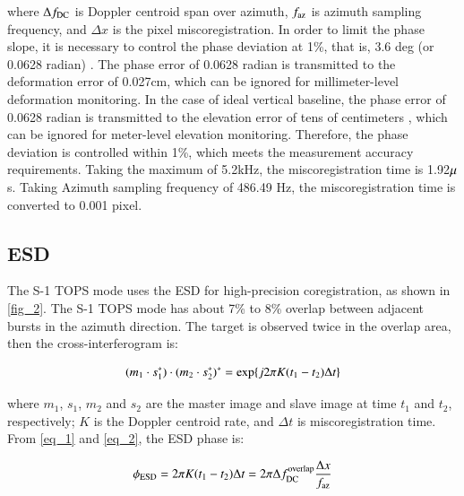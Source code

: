 \documentclass[preprint, authoryear]{elsarticle}
\begin{document}
\noindent where $\Delta f_{\rm DC}$ is Doppler centroid span over azimuth, $f_{\rm az}$ is azimuth sampling frequency, and $\Delta x$ is the pixel miscoregistration. In order to limit the phase slope, it is necessary to control the phase deviation at 1\%, that is, 3.6 deg (or 0.0628 radian) \cite{Interferometric_Processing_of_Sentinel-1_TOPS_Data}. The phase error of 0.0628 radian is transmitted to the deformation error of 0.027cm, which can be ignored for millimeter-level deformation monitoring. In the case of ideal vertical baseline, the phase error of 0.0628 radian is transmitted to the elevation error of tens of centimeters \cite{Effects_of_Phase_Error_on_the_Relative_Height_Accuracy_in_Interferometric_Synthetic_Aperture_Radar}, which can be ignored for meter-level elevation monitoring. Therefore, the phase deviation is controlled within 1\%, which meets the measurement accuracy requirements. Taking the maximum  of 5.2kHz, the miscoregistration time is 1.92$\rm\mu$s. Taking Azimuth sampling frequency of 486.49 Hz, the miscoregistration time is converted to 0.001 pixel. \par


\subsection{ESD}

The S-1 TOPS mode uses the ESD for high-precision coregistration, as shown in \ref{fig_2}. The S-1 TOPS mode has about 7\% to 8\% overlap between adjacent bursts in the azimuth direction. The target is observed twice in the overlap area, then the cross-interferogram is: \par

\begin{equation}
    (m_1 \cdot s_1^*) \cdot (m_2 \cdot s_2^*)^* = {\rm exp} \{j 2 \pi K (t_1 - t_2) \Delta t \}
    \label{eq_2}
\end{equation}

\noindent where $m_1$, $s_1$, $m_2$ and $s_2$ are the master image and slave image at time $t_1$ and $t_2$, respectively; $K$ is the Doppler centroid rate, and $\Delta t$ is miscoregistration time. From \ref{eq_1} and \ref{eq_2}, the ESD phase is: \par

\begin{equation}
    \phi_{\rm ESD} = 2 \pi K (t_1 - t_2) \Delta t = 2 \pi \Delta f_{\rm DC}^{\rm overlap} \frac{\Delta x}{f_{\rm az}}
    \label{eq_3}
\end{equation}
\end{document}
